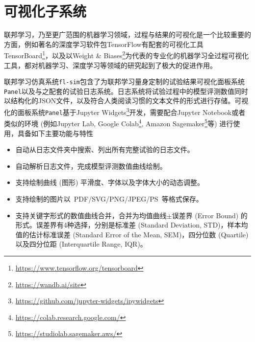 \section{可视化子系统}
\label{sec:chap5-viz}


联邦学习，乃至更广范围的机器学习领域，过程与结果的可视化是一个比较重要的方面，例如著名的深度学习软件包TensorFlow\cite{tensorflow}有配套的可视化工具TensorBoard\footnote{\url{https://www.tensorflow.org/tensorboard}}，以及以Weight \& Biases\footnote{\url{https://wandb.ai/site}}为代表的专业化的机器学习全过程可视化工具，都对机器学习、深度学习等领域的研究起到了极大的促进作用。

联邦学习仿真系统\texttt{fl-sim}包含了为联邦学习量身定制的试验结果可视化面板系统\texttt{Panel}以及与之配套的试验日志系统。日志系统将试验过程中的模型评测数值同时以结构化的JSON文件，以及符合人类阅读习惯的文本文件的形式进行存储。可视化的面板系统\texttt{Panel}基于Jupyter Widgets\cite{Granger_2021_Jupyter}\footnote{\url{https://github.com/jupyter-widgets/ipywidgets}}开发，需要配合Jupyter Notebook\cite{jupyter_2016}或者类似的环境 (例如Jupyter Lab\cite{Granger_2021_Jupyter}, Google Colab\footnote{\url{https://colab.research.google.com/}}, Amazon Sagemaker\footnote{\url{https://studiolab.sagemaker.aws/}}等) 进行使用，具备如下主要功能与特性
\begin{itemize}
    \item 自动从日志文件夹中搜索、列出所有完整试验的日志文件。
    \item 自动解析日志文件，完成模型评测数值曲线绘制。
    \item 支持绘制曲线 (图形) 平滑度、字体以及字体大小的动态调整。
    \item 支持绘制的图片以~PDF/SVG/PNG/JPEG/PS~等格式保存。
    \item 支持关键字形式的数值曲线合并，合并为均值曲线$\pm$误差界 (Error Bound) 的形式。误差界有4种选择，分别是标准差 (Standard Deviation, STD)，样本均值的估计标准误差 (Standard Error of the Mean, SEM)，四分位数 (Quartile)以及四分位距 (Interquartile Range, IQR)。
\end{itemize}

